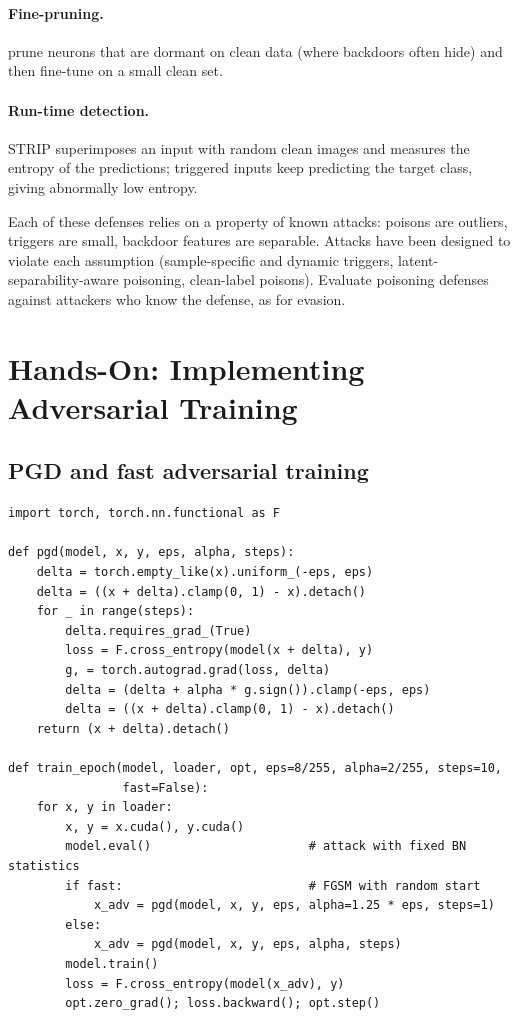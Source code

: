 \documentclass[10pt,a4paper]{extarticle}
\theoremstyle{definition}
\begin{document}
\paragraph{Fine-pruning.} \citet{liu2018fine} prune neurons that are dormant on clean data (where backdoors often hide) and then fine-tune on a small clean set.

\paragraph{Run-time detection.} STRIP \citep{gao2019strip} superimposes an input with random clean images and measures the entropy of the predictions; triggered inputs keep predicting the target class, giving abnormally low entropy.

\begin{warnbox}
Each of these defenses relies on a property of known attacks: poisons are outliers, triggers are small, backdoor features are separable. Attacks have been designed to violate each assumption (sample-specific and dynamic triggers, latent-separability-aware poisoning, clean-label poisons). Evaluate poisoning defenses against attackers who know the defense, as for evasion.
\end{warnbox}

\section{Hands-On: Implementing Adversarial Training}

\subsection{PGD and fast adversarial training}

\begin{lstlisting}
import torch, torch.nn.functional as F

def pgd(model, x, y, eps, alpha, steps):
    delta = torch.empty_like(x).uniform_(-eps, eps)
    delta = ((x + delta).clamp(0, 1) - x).detach()
    for _ in range(steps):
        delta.requires_grad_(True)
        loss = F.cross_entropy(model(x + delta), y)
        g, = torch.autograd.grad(loss, delta)
        delta = (delta + alpha * g.sign()).clamp(-eps, eps)
        delta = ((x + delta).clamp(0, 1) - x).detach()
    return (x + delta).detach()

def train_epoch(model, loader, opt, eps=8/255, alpha=2/255, steps=10,
                fast=False):
    for x, y in loader:
        x, y = x.cuda(), y.cuda()
        model.eval()                      # attack with fixed BN statistics
        if fast:                          # FGSM with random start
            x_adv = pgd(model, x, y, eps, alpha=1.25 * eps, steps=1)
        else:
            x_adv = pgd(model, x, y, eps, alpha, steps)
        model.train()
        loss = F.cross_entropy(model(x_adv), y)
        opt.zero_grad(); loss.backward(); opt.step()
\end{lstlisting}
\end{document}
